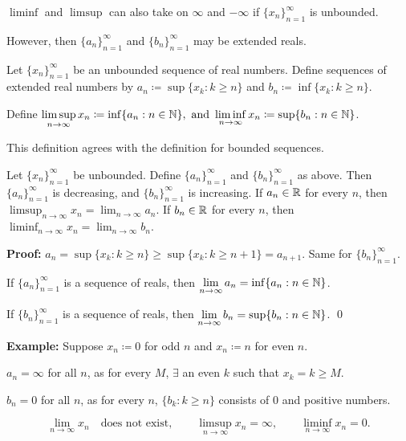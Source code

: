 \documentclass[10pt,aspectratio=149]{beamer}
\begin{document}
\begin{frame}

$\liminf$ and $\limsup$ can also take on $\infty$ and $-\infty$
if $\{x_n \}_{n=1}^\infty$ is unbounded.

\pause
However, then $\{ a_n \}_{n=1}^\infty$ and $\{ b_n \}_{n=1}^\infty$ may be extended reals.

\pause
\begin{definition}
Let $\{ x_n \}_{n=1}^\infty$ be an unbounded sequence of real numbers.  Define
sequences of extended real numbers by
$a_n \coloneqq \sup \{ x_k : k \geq n \}$ and
$b_n \coloneqq \inf \{ x_k : k \geq n \}$.

\pause
Define \quad
$\displaystyle
\limsup_{n \to \infty} x_n \coloneqq \inf \{ a_n : n \in {\mathbb{N}} \}, ~\text{and}~
\liminf_{n \to \infty} x_n \coloneqq \sup \{ b_n : n \in {\mathbb{N}} \}$.
\end{definition}

\pause
This definition agrees with the definition for bounded
sequences.

\pause
\begin{proposition}
Let $\{ x_n \}_{n=1}^\infty$ be unbounded.  Define
$\{ a_n \}_{n=1}^\infty$ and $\{ b_n \}_{n=1}^\infty$ as above.
Then $\{ a_n \}_{n=1}^\infty$ is decreasing, and $\{ b_n \}_{n=1}^\infty$ is increasing.
If $a_n \in {\mathbb{R}}$ for every $n$, then
$\displaystyle \limsup_{n\to\infty} x_n = \lim_{n\to\infty} a_n$.
If $b_n \in {\mathbb{R}}$ for every $n$, then
$\displaystyle \liminf_{n\to\infty} x_n = \lim_{n\to\infty} b_n$.
\end{proposition}

\pause
\textbf{Proof:}
$a_n = \sup \{ x_k : k \geq n \} \geq \sup \{ x_k : k \geq n+1 \} =
a_{n+1}$.  Same for $\{ b_n \}_{n=1}^\infty$.

\pause
If $\{ a_n \}_{n=1}^\infty$ is a sequence of reals, then
$\lim\limits_{n\to\infty} a_n = \inf \{ a_n : n \in {\mathbb{N}} \}$.

\pause
If $\{ b_n \}_{n=1}^\infty$ is a sequence of reals, then
$\lim\limits_{n\to\infty} b_n = \sup \{ b_n : n \in {\mathbb{N}} \}$.
\qed

\end{frame}

\begin{frame}

\textbf{Example:}
Suppose
$x_n \coloneqq 0$ for odd $n$ and $x_n \coloneqq n$ for even $n$.

\pause
\medskip

$a_n = \infty$ for all $n$, as for every $M$,
$\exists$ an even $k$ such that $x_k = k \geq M$.

\pause
\medskip

$b_n = 0$ for all $n$, as for every $n$,
$\{ b_k : k \geq n \}$ consists of $0$ and positive numbers.

\pause

\begin{equation*}
\lim_{n\to \infty} x_n \quad \text{does not exist},
\qquad
\limsup_{n\to \infty} x_n = \infty ,
\qquad
\liminf_{n\to \infty} x_n = 0.
\end{equation*}

\end{frame}
\end{document}
